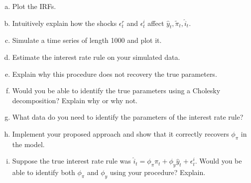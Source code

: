 \documentclass{article}
\newcommand{\1}{\mathbf{1}}
\begin{document}
\begin{enumerate}[(a)]
	\item Plot the IRFs. 
	\item Intuitively explain how the shocks $\epsilon^r_t$ and $\epsilon^i_t$ affect $\hat{y}_t,\tilde{\pi}_t,\hat{i}_t$.
	\item Simulate a time series of length 1000 and plot it.
	\item Estimate the interest rate rule on your simulated data.
	\item Explain why this procedure does not recovery the true parameters.
	\item Would you be able to identify the true parameters using a Cholesky decomposition? Explain why or why not.
	\item What data do you need to identify the parameters of the interest rate rule?
	\item Implement your proposed approach and show that it correctly recovers $\phi_\pi$ in the model.
	\item Suppose the true interest rate rule was $\hat{i}_t= \phi_\pi\hat{\pi}_t + \phi_y\hat{y}_t + \epsilon^i_t$. Would you be able to identify both $\phi_\pi$ and $\phi_y$ using your procedure? Explain.

\end{enumerate}
\end{document}
